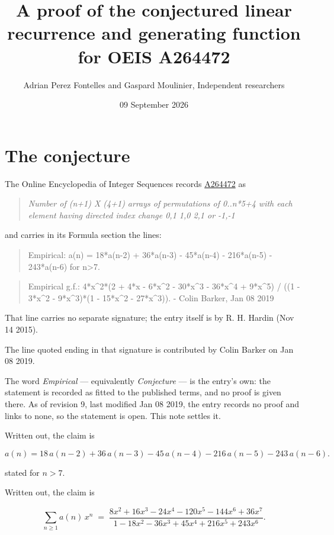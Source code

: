 \documentclass[11pt]{article}
\title{A proof of the conjectured linear recurrence and generating function for OEIS A264472}
\author{Adrian Perez Fontelles and Gaspard Moulinier, Independent researchers}
\date{09 September 2026}
\theoremstyle{definition}
\begin{document}
\maketitle
\section{The conjecture}

The Online Encyclopedia of Integer Sequences records \href{https://oeis.org/A264472}{A264472} as

\begin{quote}\itshape Number of (n+1) X (4+1) arrays of permutations of 0..n*5+4 with each element having directed index change 0,1 1,0 2,1 or -1,-1\end{quote}

and carries in its Formula section the lines:

\begin{quote}\ttfamily Empirical: a(n) = 18*a(n-2) + 36*a(n-3) - 45*a(n-4) - 216*a(n-5) - 243*a(n-6) for n>7.\end{quote}

\begin{quote}\ttfamily Empirical g.f.: 4*x\textasciicircum{}2*(2 + 4*x - 6*x\textasciicircum{}2 - 30*x\textasciicircum{}3 - 36*x\textasciicircum{}4 + 9*x\textasciicircum{}5) / ((1 - 3*x\textasciicircum{}2 - 9*x\textasciicircum{}3)*(1 - 15*x\textasciicircum{}2 - 27*x\textasciicircum{}3)). - Colin Barker, Jan 08 2019\end{quote}

That line carries no separate signature; the entry itself is by R. H. Hardin (Nov 14 2015).

The line quoted ending in that signature is contributed by Colin Barker on Jan 08 2019.

The word {\itshape Empirical} --- equivalently {\itshape Conjecture} --- is the entry's own: the statement is recorded as fitted to the published terms, and no proof is given there. As of revision 9, last modified Jan 08 2019, the entry records no proof and links to none, so the statement is open. This note settles it.

Written out, the claim is

\[a(n) = 18\,a(n-2) + 36\,a(n-3) - 45\,a(n-4) - 216\,a(n-5) - 243\,a(n-6).\]

stated for $n > 7$.

Written out, the claim is

\[\sum_{n \ge 1} a(n)\,x^n \;=\; \frac{8x^{2} + 16x^{3} - 24x^{4} - 120x^{5} - 144x^{6} + 36x^{7}}{1 - 18x^{2} - 36x^{3} + 45x^{4} + 216x^{5} + 243x^{6}}.\]
\end{document}
